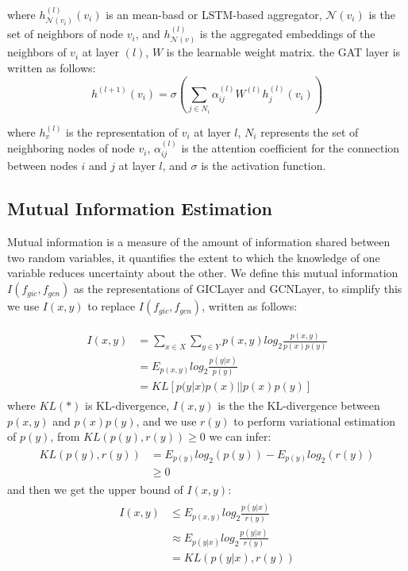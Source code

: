 \documentclass[conference]{IEEEtran}
\begin{document}
where $h_{\mathcal{N}(v_i)}^{(l)}(v_i)$ is an mean-basd or LSTM-based aggregator,  $\mathcal{N}(v_i)$ is the set of neighbors of node $v_i$, and $ h_{\mathcal{N}(v)}^{(l)}$ is the aggregated embeddings of the neighbors of $v_i$ at layer $(l)$, $W$ is the learnable weight matrix. the GAT layer is written as follows:
\begin{equation}
\label{GCN-based-form2}
  h^{(l+1)}(v_i) = \sigma \left( \sum_{j \in N_i} \alpha_{ij}^{(l)} W^{(l)} h_j^{(l)}(v_i) \right) 
\end{equation}

where $h_v^{(l)}$ is the representation of $v_i$ at layer $l$, $N_i$ represents the set of neighboring nodes of node $v_i$, $\alpha_{ij}^{(l)}$ is the attention coefficient for the connection between nodes $i$ and $j$ at layer $l$, and $\sigma$ is the activation function.



\subsection{Mutual Information Estimation}

Mutual information is a measure of the amount of information shared between two random variables, it quantifies the extent to which the knowledge of one variable reduces uncertainty about the other.
We define this mutual information $I(f_{gic},f_{gcn})$ as the representations of GICLayer and GCNLayer, to simplify this we use $I(x,y)$ to replace $I(f_{gic},f_{gcn})$, written as follows:

\label{eqn_example}
\begin{eqnarray}
\begin{split}
I(x,y) &= \sum_{x \in X} \sum_{y\in Y}p(x,y)log_2 \frac{p(x,y)}{p(x)p(y)} \\
 & = E_{p(x,y)} log_2 \frac{p(y|x)}{p(y)} \\
& = KL[p(y|x)p(x)||p(x)p(y)]
\end{split}
\end{eqnarray}
where $KL(*)$ is KL-divergence, $I(x,y)$ is the the KL-divergence between $p(x,y)$ and $p(x)p(y)$, and we use $r(y)$ to perform variational estimation of $p(y)$, from $KL(p(y),r(y)) \ge 0$ we can infer:
\begin{eqnarray}
\label{eqn_example}
\begin{split}
    KL(p(y),r(y)) &=E_{p(y)}log_2(p(y))- E_{p(y)}log_2(r(y)) \\
&\ge 0 
\end{split}
\end{eqnarray}
and then we get the upper bound of $I(x,y)$:
\setlength{\arraycolsep}{0.0em}
\begin{eqnarray}
\label{eqn_example}
\begin{split}
I(x,y) & \leq E_{p(x,y)} log_2 \frac{p(y|x)}{r(y)}  \\
& \approx E_{p(y|x)} log_2 \frac{p(y|x)}{r(y)} \\
& = KL(p(y|x),r(y))  
\end{split}
\end{eqnarray}
\setlength{\arraycolsep}{5pt}
\end{document}
